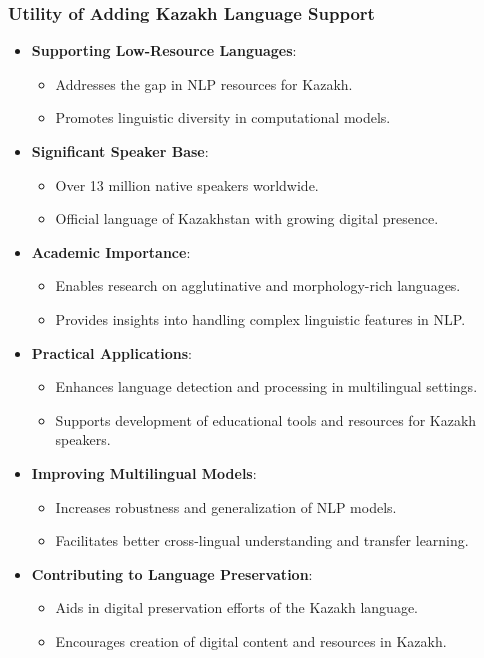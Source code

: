 \documentclass{beamer}
\begin{document}
\begin{frame}
    \frametitle{Utility of Adding Kazakh Language Support}
    \begin{itemize}
        \item \textbf{Supporting Low-Resource Languages}:
        \begin{itemize}
            \item Addresses the gap in NLP resources for Kazakh.
            \item Promotes linguistic diversity in computational models.
        \end{itemize}
        \item \textbf{Significant Speaker Base}:
        \begin{itemize}
            \item Over 13 million native speakers worldwide.
            \item Official language of Kazakhstan with growing digital presence.
        \end{itemize}
        \item \textbf{Academic Importance}:
        \begin{itemize}
            \item Enables research on agglutinative and morphology-rich languages.
            \item Provides insights into handling complex linguistic features in NLP.
        \end{itemize}
        \item \textbf{Practical Applications}:
        \begin{itemize}
            \item Enhances language detection and processing in multilingual settings.
            \item Supports development of educational tools and resources for Kazakh speakers.
        \end{itemize}
        \item \textbf{Improving Multilingual Models}:
        \begin{itemize}
            \item Increases robustness and generalization of NLP models.
            \item Facilitates better cross-lingual understanding and transfer learning.
        \end{itemize}
        \item \textbf{Contributing to Language Preservation}:
        \begin{itemize}
            \item Aids in digital preservation efforts of the Kazakh language.
            \item Encourages creation of digital content and resources in Kazakh.
        \end{itemize}
    \end{itemize}
\end{frame}
\end{document}
